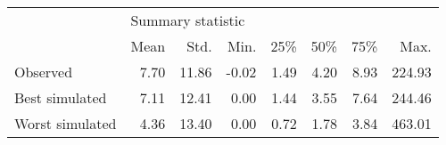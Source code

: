 \begin{tabular}{lrrrrrrr}
\toprule
{} & \multicolumn{7}{l}{Summary statistic} \\
{} &              Mean &   Std. &  Min. &   25\% &   50\% &   75\% &    Max. \\
\midrule
Observed        &              7.70 &  11.86 & -0.02 &  1.49 &  4.20 &  8.93 &  224.93 \\
Best simulated  &              7.11 &  12.41 &  0.00 &  1.44 &  3.55 &  7.64 &  244.46 \\
Worst simulated &              4.36 &  13.40 &  0.00 &  0.72 &  1.78 &  3.84 &  463.01 \\
\bottomrule
\end{tabular}
